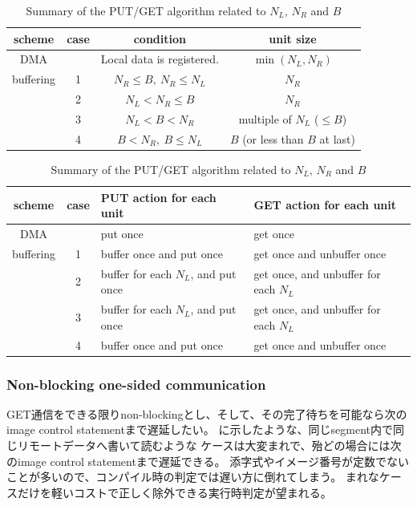 \begin{table}[tbh]
 \caption{Summary of the PUT/GET algorithm related to $N_L$, $N_R$ and $B$}
 \label{tab:putget}
 \begin{flushleft}
  \begin{tabular}{|@{~}c@{~}|c||@{~}c@{~}|@{~}c@{~}|}
\hline
scheme &
case &
condition &
unit size \\
\hline
\hline
DMA &
&
Local data is registered. &
$\min(N_L, N_R)$ \\
\hline
buffering &
1 & 
$N_R \leq B,~ N_R \leq N_L$ &
$N_R$ \\
\cline{2-4}
&
2 &
$N_L < N_R \leq B$ &
$N_R$ \\
\cline{2-4}
&
3 &
$N_L < B < N_R$ &
multiple of $N_L$ ($\leq B$) \\
\cline{2-4}
&
4 &
$B < N_R,~ B \leq N_L$ &
$B$ (or less than $B$ at last) \\
\hline
  \end{tabular}
 \end{flushleft}
 \begin{flushleft}
  \begin{tabular}{|@{~}c@{~}|c||@{~~}l@{~~}|@{~~}l@{~~}|}
\hline
scheme &
case &
PUT action for each unit &
GET action for each unit \\
\hline
\hline
DMA &
&
put once &
get once \\
\hline
buffering &
1 &
buffer once and put once &
get once and unbuffer once \\
\cline{2-4}
&
2 &
buffer for each $N_L$, and put once &
get once, and unbuffer for each $N_L$ \\
\cline{2-4}
&
3 &
buffer for each $N_L$, and put once &
get once, and unbuffer for each $N_L$ \\
\cline{2-4}
&
4 &
buffer once and put once &
get once and unbuffer once \\
\hline
  \end{tabular}
 \end{flushleft}
\end{table}



\subsubsection{Non-blocking one-sided communication}

GET通信をできる限りnon-blockingとし、そして、その完了待ちを可能なら次のimage control statementまで遅延したい。
に示したような、同じsegment内で同じリモートデータへ書いて読むような
ケースは大変まれで、殆どの場合には次のimage control statementまで遅延できる。
添字式やイメージ番号が定数でないことが多いので、コンパイル時の判定では遅い方に倒れてしまう。
まれなケースだけを軽いコストで正しく除外できる実行時判定が望まれる。

